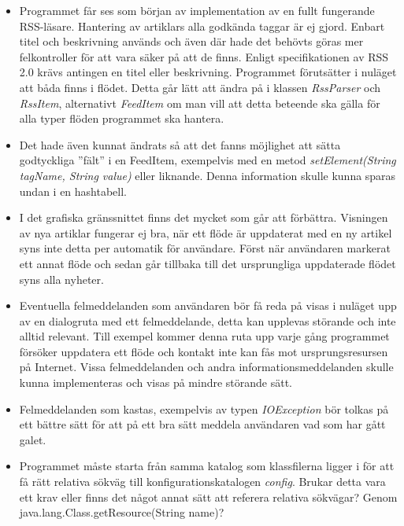 \documentclass[titlepage, twoside, a4paper, 12pt]{article}
\begin{document}
\begin{itemize}
\item Programmet får ses som början av implementation av en fullt fungerande
RSS-läsare. Hantering av artiklars alla godkända taggar är ej
gjord. Enbart titel och beskrivning används och även där hade det
behövts göras mer felkontroller för att vara säker på att de
finns. Enligt specifikationen av RSS 2.0 krävs antingen en titel eller
beskrivning. Programmet förutsätter i nuläget att båda finns i
flödet. Detta går lätt att ändra på i klassen \textit{RssParser} och
\textit{RssItem}, alternativt \textit{FeedItem} om man vill att detta
beteende ska gälla för alla typer flöden programmet ska hantera.

\item Det hade även kunnat ändrats så att det fanns möjlighet att sätta
godtyckliga ''fält'' i en FeedItem, exempelvis med en metod
\textit{setElement(String tagName, String value)} eller
liknande. Denna information skulle kunna sparas undan i en hashtabell.

\item I det grafiska gränssnittet finns det mycket som går att
förbättra. Visningen av nya artiklar fungerar ej bra, när ett flöde är
uppdaterat med en ny artikel syns inte detta per automatik för
användare. Först när användaren markerat ett annat flöde och sedan går
tillbaka till det ursprungliga uppdaterade flödet syns alla nyheter.

\item Eventuella felmeddelanden som användaren bör få reda på visas i
nuläget upp av en dialogruta med ett felmeddelande, detta kan upplevas
störande och inte alltid relevant. Till exempel kommer denna ruta upp
varje gång programmet försöker uppdatera ett flöde och kontakt inte
kan fås mot ursprungsresursen på Internet. Vissa felmeddelanden och
andra informationsmeddelanden skulle kunna implementeras och visas på
mindre störande sätt.

\item Felmeddelanden som kastas, exempelvis av typen
  \textit{IOException} bör tolkas på ett bättre sätt för att på ett
  bra sätt meddela användaren vad som har gått galet.

\item Programmet måste starta från samma katalog som klassfilerna ligger i
för att få rätt relativa sökväg till konfigurationskatalogen
\textit{config}. Brukar detta vara ett krav eller finns det något
annat sätt att referera relativa sökvägar? Genom
java.lang.Class.getResource(String name)?


\end{itemize}
\end{document}
